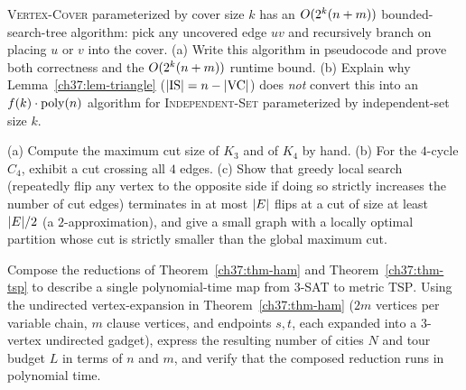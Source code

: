 \begin{exercise}
\label{ch37:ex-fpt}
\textsc{Vertex-Cover} parameterized by cover size $k$ has an $O(2^k(n+m))$
bounded-search-tree algorithm: pick any uncovered edge $uv$ and recursively branch on placing
$u$ or $v$ into the cover. (a) Write this algorithm in pseudocode and prove both correctness and
the $O(2^k(n+m))$ runtime bound. (b) Explain why Lemma~\ref{ch37:lem-triangle}
($\lvert\text{IS}\rvert=n-\lvert\text{VC}\rvert$) does \emph{not} convert this into an $f(k)\cdot\operatorname{poly}(n)$ algorithm
for \textsc{Independent-Set} parameterized by independent-set size $k$.
\end{exercise}

\begin{exercise}
\label{ch37:ex-maxcut}
(a) Compute the maximum cut size of $K_3$ and of $K_4$ by hand. (b) For the $4$-cycle
$C_4$, exhibit a cut crossing all $4$ edges. (c) Show that
greedy local search (repeatedly flip any vertex to the opposite side if doing so strictly increases the number of cut edges) terminates in at most $\lvert E\rvert$ flips at a cut of size at least $\lvert E\rvert/2$ (a $2$-approximation), and give a small graph with a locally optimal partition whose cut is strictly smaller than the global maximum cut.
\end{exercise}

\begin{exercise}
\label{ch37:ex-transitive}
Compose the reductions of Theorem~\ref{ch37:thm-ham} and Theorem~\ref{ch37:thm-tsp} to describe a single polynomial-time map
from \textsc{3-SAT} to metric \textsc{TSP}. Using the undirected vertex-expansion in Theorem~\ref{ch37:thm-ham} ($2m$ vertices per variable chain, $m$ clause vertices, and endpoints $s,t$, each expanded into a $3$-vertex undirected gadget), express the resulting number of cities $N$ and tour budget $L$ in terms of $n$ and $m$, and verify that the composed reduction runs in polynomial time.
\end{exercise}
